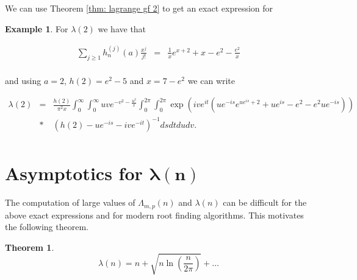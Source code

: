 \documentclass[12pt]{article}
\newtheorem{theorem}{Theorem}
\theoremstyle{plain}
\theoremstyle{definition}
\newtheorem{eg}[thm]{Example}
\theoremstyle{remark}
\theoremstyle{definition}
\begin{document}
We can use Theorem \ref{thm: lagrange gf 2} to get an exact expression for 

\begin{eg}
For $\lambda(2)$ we have that 

\begin{eqnarray*}
    \sum_{j \geq 1} h_n^{(j)}(a) \frac{x^j}{j!} & = & \frac{1}{x}e^{x+2} + x -e^2 - \frac{e^2}{x}  \\
\end{eqnarray*} 

and using $a=2$, $h(2)=e^2 -5$ and $x=7-e^2$ we can write

\begin{eqnarray*}
    \lambda(2)& = & \frac{h(2)}{\pi^2 x} \int_0^\infty\int_0^\infty uve^{-v^2-\frac{u^2}{x}}\int_0^{2\pi}\int_0^{2\pi} \exp\left(ive^{it}(ue^{-is}e^{ue^{is}+2} + ue^{is} -e^2 - e^2 ue^{-is})\right) \\
    & * & \left(h(2)-ue^{-is}-ive^{-it}\right)^{-1} ds dt du dv.\\
\end{eqnarray*}
    
\end{eg}

\section{Asymptotics for $\mathbf{\lambda(n)}$}

The computation of large values of $\Lambda_{m,p}(n)$ and $\lambda(n)$ can be difficult for the above exact expressions and for modern root finding algorithms. This motivates the following theorem.

\begin{theorem}
    $$ \lambda(n) = n + \sqrt{n\ln\left(\frac{n}{2\pi}\right)} + \dots$$
\end{theorem}
\end{document}
